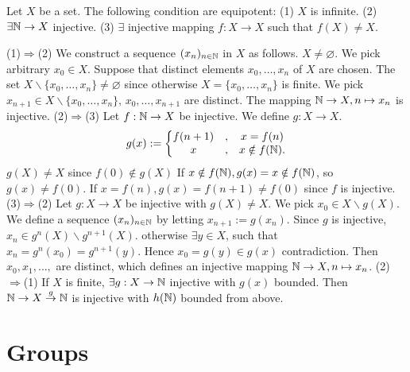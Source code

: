 \documentclass{book}
\numberwithin{equation}{section}
\begin{document}
\begin{propositionenv}
    Let $X$ be a set. The following condition are equipotent:
    \newline
    (1) $X$ is infinite.
    \newline
    (2) $\exists \mathbb{N}\rightarrow X$ injective.
    \newline
    (3) $\exists$ injective mapping $f:X\rightarrow X$ such that $f(X)\not=X$.
\end{propositionenv}
\begin{proofenv}
    \quad
    \newline
    (1)$\Rightarrow$(2) We construct a sequence $(x_n)_{n\in \mathbb{N}}$ in $X$ as follows. $X\not=\varnothing$. We pick arbitrary $x_0\in X$. Suppose that distinct elements $x_0, \dots,  x_n$ of $X$ are chosen. The set $X\backslash\{x_0, \dots, x_n\}\not=\varnothing$ since otherwise $X=\{x_0, \dots, x_n\}$ is finite. We pick $x_{n+1}\in X\backslash\{x_0, \dots, x_n\}, \,  x_0, \dots, x_{n+1}$ are distinct. The mapping $\mathbb{N}\rightarrow X,  n\mapsto x_n$ is injective.
    \newline
    (2)$\Rightarrow$(3) Let $f:\mathbb{N}\rightarrow X$ be injective. We define $g:X\rightarrow X$.
    $$g(x):=
\left\{\begin{matrix}
 f(n+1)&,  &x=f(n) \\
x&, &x\notin f(\mathbb{N}).
\end{matrix}\right. $$
$g(X)\not=X$ since $f(0)\notin g(X)$ If $x\notin f(\mathbb{N}), g(x)=x\notin f(\mathbb{N})$,  so $g(x)\not=f(0)$. If $x=f(n),  g(x)=f(n+1)\not=f(0)$ since $f$ is injective.
\newline
(3)$\Rightarrow$(2) Let $g:X\rightarrow X$ be injective with $g(X)\not=X$. We pick $x_0\in X\backslash g(X)$. We define a sequence $(x_n)_{n\in\mathbb{N}}$ by letting $x_{n+1}:=g(x_n)$. Since $g$ is injective,  $x_n\in g^n(X)\backslash g^{n+1}(X)$. otherwise $\exists y\in X$,  such that $x_n=g^{n}(x_0)=g^{n+1}(y)$. Hence $x_0=g(y)\in g(x)$ contradiction. Then $x_0, x_1, \dots, $ are distinct,  which defines an injective mapping $\mathbb{N}\rightarrow X, n\mapsto x_n$.
\newline
(2)$\Rightarrow$(1) If $X$ is finite,  $\exists g:X\rightarrow\mathbb{N}$ injective with $g(x)$ bounded. Then $\mathbb{N}\rightarrow X\overset{g}{\rightarrow}\mathbb{N}$ is injective with $h(\mathbb{N})$ bounded from above.
\end{proofenv}

\chapter{Groups}
\end{document}
